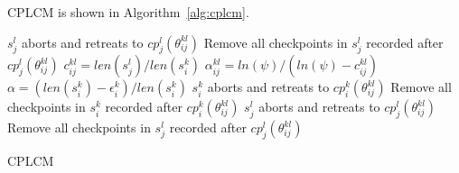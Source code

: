 \documentclass[conference]{IEEEtran}
\begin{document}
CPLCM is shown in Algorithm~\ref{alg:cplcm}. 
%
\begin{algorithm}[!htpd]
\footnotesize{
\LinesNumbered
{}
	{$s_{j}^l$ aborts and retreats to $cp_j^l(\theta_{ij}^{kl})$\label{cp-step_sicommits}\;
	Remove all checkpoints in $s_j^l$ recorded after $cp_j^l(\theta_{ij}^{kl})$\label{cp_step_rem_cp_jl_1}}
	{$c_{ij}^{kl}=len(s_j^l)/len(s_i^k)$\label{cp-step_cijkl}\;
	$\alpha_{ij}^{kl}=ln(\psi)/(ln(\psi)-c_{ij}^{kl})$\label{cp-step_alphaijkl}\;
	$\alpha=\left(len(s_i^k)-\epsilon_i^k\right)/len(s_i^k)$\label{cp_step_alpha}\;
	{$s_{i}^k$ aborts and retreats to $cp_i^k(\theta_{ij}^{kl})$\label{cp-step_siaborts}\;
	Remove all checkpoints in $s_i^k$ recorded after $cp_i^k(\theta_{ij}^{kl})$\label{cp_step_rem_cp_ik}}
	{$s_{j}^l$ aborts and retreats to $cp_j^l(\theta_{ij}^{kl})$\label{cp-step_sjaborts}\;
	Remove all checkpoints in $s_j^l$ recorded after $cp_j^l(\theta_{ij}^{kl})$\label{cp_step_rem_cp_jl_2}}
	}
	}
\caption{CPLCM}
\label{alg:cplcm}
\end{algorithm}
%
\end{document}
